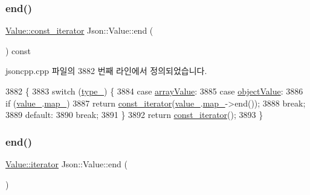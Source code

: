 \subsubsection{\texorpdfstring{end()}{end()}\hspace{0.1cm}{\footnotesize\ttfamily [1/2]}}
{\footnotesize\ttfamily \hyperlink{class_json_1_1_value_af92282ca92b58b320debd486afb7696a}{Value\+::const\+\_\+iterator} Json\+::\+Value\+::end (\begin{DoxyParamCaption}{ }\end{DoxyParamCaption}) const}



jsoncpp.\+cpp 파일의 3882 번째 라인에서 정의되었습니다.


\begin{DoxyCode}
3882                                      \{
3883   \textcolor{keywordflow}{switch} (\hyperlink{class_json_1_1_value_abd222c2536dc88bf330dedcd076d2356}{type\_}) \{
3884   \textcolor{keywordflow}{case} \hyperlink{namespace_json_a7d654b75c16a57007925868e38212b4eadc8f264f36b55b063c78126b335415f4}{arrayValue}:
3885   \textcolor{keywordflow}{case} \hyperlink{namespace_json_a7d654b75c16a57007925868e38212b4eae8386dcfc36d1ae897745f7b4f77a1f6}{objectValue}:
3886     \textcolor{keywordflow}{if} (\hyperlink{class_json_1_1_value_aef578244546212705b9f81eb84d7e151}{value\_}.\hyperlink{union_json_1_1_value_1_1_value_holder_a1e7a5b86d4f52234f55c847ad1ce389a}{map\_})
3887       \textcolor{keywordflow}{return} \hyperlink{class_json_1_1_value_af92282ca92b58b320debd486afb7696a}{const\_iterator}(\hyperlink{class_json_1_1_value_aef578244546212705b9f81eb84d7e151}{value\_}.\hyperlink{union_json_1_1_value_1_1_value_holder_a1e7a5b86d4f52234f55c847ad1ce389a}{map\_}->end());
3888     \textcolor{keywordflow}{break};
3889   \textcolor{keywordflow}{default}:
3890     \textcolor{keywordflow}{break};
3891   \}
3892   \textcolor{keywordflow}{return} \hyperlink{class_json_1_1_value_af92282ca92b58b320debd486afb7696a}{const\_iterator}();
3893 \}
\end{DoxyCode}
\mbox{\label{class_json_1_1_value_a2f961eff73f7f79cd29260b6cbd42558}} 
\subsubsection{\texorpdfstring{end()}{end()}\hspace{0.1cm}{\footnotesize\ttfamily [2/2]}}
{\footnotesize\ttfamily \hyperlink{class_json_1_1_value_a341cdf2e01f8b3c5b7317aa2f0768c53}{Value\+::iterator} Json\+::\+Value\+::end (\begin{DoxyParamCaption}{ }\end{DoxyParamCaption})}



